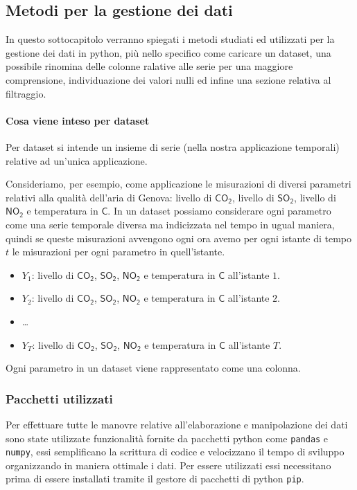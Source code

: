 \subsection{Metodi per la gestione dei dati}
In questo sottocapitolo verranno spiegati i metodi studiati ed utilizzati per la gestione dei
dati in python, più nello specifico come caricare un dataset, una possibile rinomina delle
colonne ralative alle serie per una maggiore comprensione, individuazione dei valori
nulli ed infine una sezione relativa al filtraggio.

\paragraph{Cosa viene inteso per dataset} Per dataset si intende un insieme di
serie (nella nostra applicazione temporali) relative ad un'unica applicazione.

\begin{esempio}
    Consideriamo, per esempio, come applicazione le misurazioni di diversi parametri
    relativi alla qualità dell'aria di Genova: livello di $\mathsf{CO_2}$,
    livello di $\mathsf{SO_2}$, livello di $\mathsf{NO_2}$ e temperatura in \textdegree$\mathsf{C}$.
    In un dataset possiamo considerare ogni parametro come una serie temporale diversa ma indicizzata
    nel tempo in ugual maniera, quindi se queste misurazioni avvengono ogni ora avemo
    per ogni istante di tempo $t$ le misurazioni per ogni parametro in quell'istante.
    \begin{itemize}
        \setlength\itemsep{-0.5em}
        \item $Y_1$: livello di $\mathsf{CO_2}$, $\mathsf{SO_2}$, $\mathsf{NO_2}$ e temperatura in \textdegree$\mathsf{C}$ all'istante $1$.
        \item $Y_2$: livello di $\mathsf{CO_2}$, $\mathsf{SO_2}$, $\mathsf{NO_2}$ e temperatura in \textdegree$\mathsf{C}$ all'istante $2$.
        \item \dots
        \item $Y_T$: livello di $\mathsf{CO_2}$, $\mathsf{SO_2}$, $\mathsf{NO_2}$ e temperatura in \textdegree$\mathsf{C}$ all'istante $T$.
    \end{itemize}
    Ogni parametro in un dataset viene rappresentato come una colonna.
\end{esempio}

\subsubsection{Pacchetti utilizzati}
Per effettuare tutte le manovre relative all'elaborazione e manipolazione dei dati sono state
utilizzate funzionalità fornite da pacchetti python come \texttt{pandas} e \texttt{numpy}, essi semplificano
la scrittura di codice e velocizzano il tempo di sviluppo organizzando in maniera ottimale
i dati. Per essere utilizzati essi necessitano prima di essere installati tramite il
gestore di pacchetti di python \texttt{pip}.
